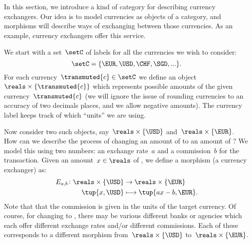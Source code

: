 
\section{}
\label{sec:currency_cat}
In this section, we introduce a kind of category for describing currency exchangers. Our idea is to model currencies as objects of a category, and morphisms will describe ways of exchanging between those currencies. As an example, currency exchangers offer this service.

We start with a set~$\setC$ of labels for all the currencies we wish to consider:
\begin{equation*}
  \setC = \{ \EUR, \USD, \CHF, \SGD, ... \}.
\end{equation*}
For each currency~$\transmuted{c} \in \setC$ we define an object~$\reals \times \{\transmuted{c}\}$ which represents possible amounts of the given currency~$\transmuted{c}$ (we will ignore the issue of rounding currencies to an accuracy of two decimals places, and we allow negative amounts). The currency label keeps track of which ``units'' we are using.


Now consider two such objects, say~$\reals \times \{\USD\}$ and~$\reals \times \{\EUR\}$. How can we describe the process of changing an amount of \USD to an amount of \EUR? We model this using two numbers: an exchange rate~$a$ and a commission~$b$ for the transaction. Given an amount~$x \in \reals$ of \USD, we define a morphism (a currency exchanger) as:
\begin{equation*}
  \label{eq:def_curr_ex}
  \begin{aligned}
  E_{a,b} \colon \reals \times \{\USD\} &\rightarrow \reals \times \{\EUR\}\\
  \tup{x, \USD} &\longmapsto \tup{ax - b, \EUR}.
\end{aligned}
\end{equation*}
Note that that the commission is given in the units of the target currency. Of course, for changing \USD to \EUR, there may be various different banks or agencies which each offer different exchange rates and/or different commissions. Each of these corresponds to a different morphism from~$\reals \times \{\USD\}$ to~$\reals \times \{\EUR\}$.

